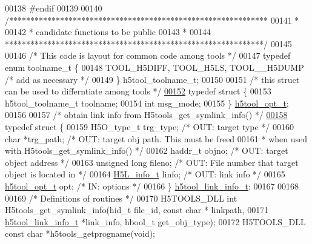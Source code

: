 \begin{DoxyCode}
00138 \textcolor{preprocessor}{#endif}
00139 
00140 \textcolor{comment}{/*************************************************************}
00141 \textcolor{comment}{ *}
00142 \textcolor{comment}{ * candidate functions to be public}
00143 \textcolor{comment}{ *}
00144 \textcolor{comment}{ *************************************************************/}
00145 
00146 \textcolor{comment}{/* This code is layout for common code among tools */}
00147 \textcolor{keyword}{typedef} \textcolor{keyword}{enum} toolname\_t \{
00148     TOOL\_H5DIFF, TOOL\_H5LS, TOOL\_\_H5DUMP \textcolor{comment}{/* add as necessary */}
00149 \} h5tool\_toolname\_t;
00150 
00151 \textcolor{comment}{/* this struct can be used to differntiate among tools */}
\hyperlink{structh5tool__opt__t}{00152} \textcolor{keyword}{typedef} \textcolor{keyword}{struct }\{
00153     h5tool\_toolname\_t toolname;
00154     \textcolor{keywordtype}{int} msg\_mode;
00155 \} \hyperlink{structh5tool__opt__t}{h5tool\_opt\_t};
00156 
00157 \textcolor{comment}{/* obtain link info from H5tools\_get\_symlink\_info() */}
\hyperlink{structh5tool__link__info__t}{00158} \textcolor{keyword}{typedef} \textcolor{keyword}{struct }\{
00159     H5O\_type\_t  trg\_type;  \textcolor{comment}{/* OUT: target type */}
00160     \textcolor{keywordtype}{char} *trg\_path;        \textcolor{comment}{/* OUT: target obj path. This must be freed }
00161 \textcolor{comment}{                            *      when used with H5tools\_get\_symlink\_info() */}
00162     haddr\_t     objno;     \textcolor{comment}{/* OUT: target object address */}
00163     \textcolor{keywordtype}{unsigned} \textcolor{keywordtype}{long}  fileno; \textcolor{comment}{/* OUT: File number that target object is located in */}
00164     \hyperlink{struct_h5_l__info__t}{H5L\_info\_t} linfo;      \textcolor{comment}{/* OUT: link info */}
00165     \hyperlink{structh5tool__opt__t}{h5tool\_opt\_t} opt;      \textcolor{comment}{/* IN: options */}
00166 \} \hyperlink{structh5tool__link__info__t}{h5tool\_link\_info\_t};
00167 
00168 
00169 \textcolor{comment}{/* Definitions of routines */}
00170 H5TOOLS\_DLL \textcolor{keywordtype}{int} H5tools\_get\_symlink\_info(hid\_t file\_id, \textcolor{keyword}{const} \textcolor{keywordtype}{char} * linkpath,
00171     \hyperlink{structh5tool__link__info__t}{h5tool\_link\_info\_t} *link\_info, hbool\_t get\_obj\_type);
00172 H5TOOLS\_DLL \textcolor{keyword}{const} \textcolor{keywordtype}{char} *h5tools\_getprogname(\textcolor{keywordtype}{void});

\end{DoxyCode}
